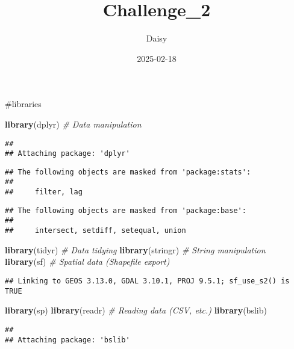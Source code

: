 \documentclass[
]{article}
\title{Challenge\_2}
\author{Daisy}
\date{2025-02-18}
\newenvironment{Shaded}{\begin{snugshade}}{\end{snugshade}}
\newcommand{\CommentTok}[1]{\textcolor[rgb]{0.56,0.35,0.01}{\textit{#1}}}
\newcommand{\FunctionTok}[1]{\textcolor[rgb]{0.13,0.29,0.53}{\textbf{#1}}}
\newcommand{\NormalTok}[1]{#1}
\begin{document}
\maketitle

\#libraries

\begin{Shaded}
\begin{Highlighting}[]
\FunctionTok{library}\NormalTok{(dplyr)    }\CommentTok{\# Data manipulation}
\end{Highlighting}
\end{Shaded}

\begin{verbatim}
## 
## Attaching package: 'dplyr'
\end{verbatim}

\begin{verbatim}
## The following objects are masked from 'package:stats':
## 
##     filter, lag
\end{verbatim}

\begin{verbatim}
## The following objects are masked from 'package:base':
## 
##     intersect, setdiff, setequal, union
\end{verbatim}

\begin{Shaded}
\begin{Highlighting}[]
\FunctionTok{library}\NormalTok{(tidyr)    }\CommentTok{\# Data tidying}
\FunctionTok{library}\NormalTok{(stringr)  }\CommentTok{\# String manipulation}
\FunctionTok{library}\NormalTok{(sf) }\CommentTok{\# Spatial data (Shapefile export)}
\end{Highlighting}
\end{Shaded}

\begin{verbatim}
## Linking to GEOS 3.13.0, GDAL 3.10.1, PROJ 9.5.1; sf_use_s2() is TRUE
\end{verbatim}

\begin{Shaded}
\begin{Highlighting}[]
\FunctionTok{library}\NormalTok{(sp) }
\FunctionTok{library}\NormalTok{(readr)    }\CommentTok{\# Reading data (CSV, etc.)}
\FunctionTok{library}\NormalTok{(bslib)}
\end{Highlighting}
\end{Shaded}

\begin{verbatim}
## 
## Attaching package: 'bslib'
\end{verbatim}
\end{document}
